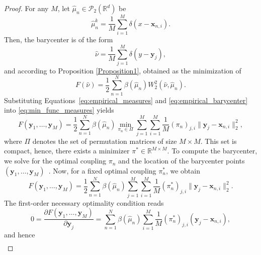 \documentclass[a4paper, 11pt]{article}
\newcommand{\R}{\mathbb{R}}
\newcommand{\hmu}{\hat{\mu}_{n}}
\theoremstyle{plain} %
\begin{document}
	\begin{proof}
	For any $ M $, let $ \hmu \in \mathcal{P}_{2}\left( \R^{d} \right) $ be
	\begin{equation}\label{eq:empirical_measures}
		\hmu^{k} = \frac{1}{M}\sum_{i=1}^{M}\delta \left( x - \bm{x}_{n,i} \right).
	\end{equation}
	Then, the barycenter is of the form
	\begin{equation}\label{eq:empirical_barycenter}
		\hat{\nu} = \frac{1}{M}\sum_{j=1}^{M}\delta \left( y - \bm{y}_{j} \right),
	\end{equation}
	and according to Proposition \ref{Proposition1}, obtained as the minimization of
	\begin{equation}\label{eq:min_func_measures}
		F \left( \hat{\nu} \right) =  \frac{1}{2}\sum_{n=1}^{N}\beta \left( \hmu \right)W_{2}^{2} \left( \hat{\nu}, \hmu \right).
	\end{equation} 
	Substituting Equations~\eqref{eq:empirical_measures} and \eqref{eq:empirical_barycenter} into \eqref{eq:min_func_measures} yields
	\begin{equation}
		F \left(\bm{y}_{1}, \dots, \bm{y}_{M} \right) = \frac{1}{2}\sum_{n=1}^{N}\beta \left( \hmu \right) \min_{\pi_{n} \in \Pi} \sum_{j=1}^{M} \sum_{i=1}^{M} \frac{1}{M}\left(\pi_{n}\right)_{j,i}\|\bm{y}_{j} - \bm{x}_{n,i} \|_{2}^{2},  
	\end{equation}
	where $ \Pi$ denotes the set of permutation matrices of size $ M \times M $. This set is compact, hence, there exists a minimizer $ \pi^* \in \R^{M \times M}$.  To compute the barycenter, we solve for the optimal coupling $ \pi_{n} $  and the location of the barycenter points $\left(\bm{y}_{1}, \dots, \bm{y}_{M} \right)$~\cite{cuturi2014}. Now, for a fixed optimal coupling $ \pi^{*}_{n} $, we obtain
	\begin{equation}
	F \left(\bm{y}_{1}, \dots, \bm{y}_{M} \right) = \frac{1}{2}\sum_{n=1}^{N}\beta \left( \hmu \right) \sum_{j=1}^{M} \sum_{i=1}^{M} \frac{1}{M}\left(\pi^{*}_{n}\right)_{j,i}\|\bm{y}_{j} - \bm{x}_{n,i} \|_{2}^{2}.
	\end{equation}
	The first-order necessary optimality condition reads
	\begin{equation}
		0 = \frac{\partial F \left(\bm{y}_{1}, \dots, \bm{y}_{M} \right)}{\partial \bm{y}_{j}} = \sum_{n=1}^{N}\beta(\hmu)\sum_{i=1}^{M} \frac{1}{M}\left(\pi^{*}_{n}\right)_{j,i}\left( \bm{y}_{j} - \bm{x}_{n,i} \right),
	\end{equation}
	and hence
	\begin{align}

\end{align}
\end{proof}
\end{document}
